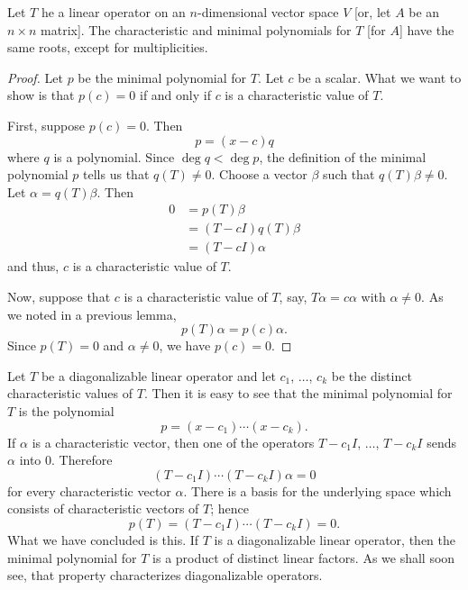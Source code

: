 \begin{theorem}\label{theorem:6.3}
    Let \(T\) he a linear operator on an \(n\)-dimensional vector space \(V\) [or, let \(A\) be an \(n\times n\) matrix]. The characteristic and minimal polynomials for \(T\) [for \(A\)] have the same roots, except for multiplicities.
\end{theorem}

\begin{proof}
    Let \(p\) be the minimal polynomial for \(T\). Let \(c\) be a scalar. What we want to show is that \(p\left(c\right)=0\) if and only if \(c\) is a characteristic value of \(T\).

    First, suppose \(p\left(c\right)=0\). Then
    \begin{equation*}
        p=\left(x-c\right)q
    \end{equation*}
    where \(q\) is a polynomial. Since \(\deg q<\deg p\), the definition of the minimal polynomial \(p\) tells us that \(q\left(T\right)\ne0\). Choose a vector \(\beta\) such that \(q\left(T\right)\beta\ne0\). Let \(\alpha=q\left(T\right)\beta\). Then
    \begin{align*}
        0&=p\left(T\right)\beta\\
         &=\left(T-cI\right)q\left(T\right)\beta\\
         &=\left(T-cI\right)\alpha
    \end{align*}
    and thus, \(c\) is a characteristic value of \(T\).

    Now, suppose that \(c\) is a characteristic value of \(T\), say, \(T\alpha=c\alpha\) with \(\alpha\ne0\). As we noted in a previous lemma,
    \begin{equation*}
        p\left(T\right)\alpha=p\left(c\right)\alpha.
    \end{equation*}
    Since \(p\left(T\right)=0\) and \(\alpha\ne0\), we have \(p\left(c\right)=0\).
\end{proof}

Let \(T\) be a diagonalizable linear operator and let \(c_1\), \(\ldots\), \(c_k\) be the distinct characteristic values of \(T\). Then it is easy to see that the minimal polynomial for \(T\) is the polynomial
\begin{equation*}
    p=\left(x-c_1\right)\cdots\left(x-c_k\right).
\end{equation*}
If \(\alpha\) is a characteristic vector, then one of the operators \(T-c_1I\), \(\ldots\), \(T-c_kI\) sends \(\alpha\) into \(0\). Therefore
\begin{equation*}
    \left(T-c_1I\right)\cdots\left(T-c_kI\right)\alpha=0
\end{equation*}
for every characteristic vector \(\alpha\). There is a basis for the underlying space which consists of characteristic vectors of \(T\); hence
\begin{equation*}
    p\left(T\right)=\left(T-c_1I\right)\cdots\left(T-c_kI\right)=0.
\end{equation*}
What we have concluded is this. If \(T\) is a diagonalizable linear operator, then the minimal polynomial for \(T\) is a product of distinct linear factors. As we shall soon see, that property characterizes diagonalizable operators.

